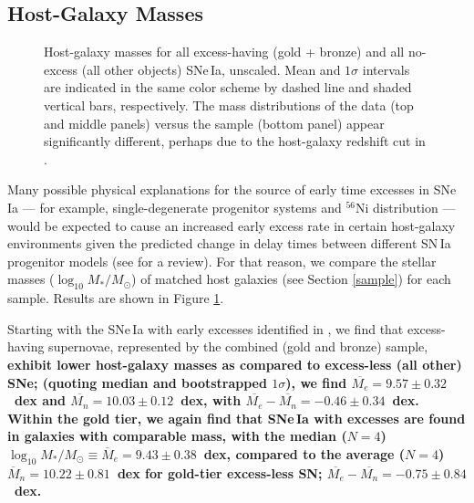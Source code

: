 \documentclass[twocolumn,twocolappendix, linenumbers]{aastex631} %
\begin{document}
\subsection{Host-Galaxy Masses}
\begin{figure}
     \centering
    \hfill

     \hfill
        \caption{Host-galaxy masses for all excess-having (gold + bronze) and all no-excess (all other objects) SNe\,Ia, unscaled. Mean and $1\sigma$ intervals are indicated in the same color scheme by dashed line and shaded vertical bars, respectively.  The mass distributions of the \citet{Yao19} data (top and middle panels) versus the \citet{Dhawan22} sample (bottom panel) appear significantly different, perhaps due to the host-galaxy redshift cut in \citet{Dhawan22}.
        }
        \label{fig:masses}
    
\end{figure}

Many possible physical explanations for the source of early time excesses in SNe\,Ia --- for example, single-degenerate progenitor systems \citep{Kasen10} and $^{56}$Ni distribution \citep{Piro13} --- would be expected to cause an increased early excess rate in certain host-galaxy environments given the predicted change in delay times between different SN\,Ia progenitor models (see \citealp{Maoz14} for a review).  
For that reason, we compare the stellar masses ($\log_{10} M_* / M_\odot$) of matched host galaxies (see Section \ref{sample}) for each sample. Results are shown in Figure \ref{fig:masses}.

Starting with the SNe\,Ia with early excesses identified in \cite{Burke22a}, we find that excess-having supernovae, represented by the combined (gold and bronze) sample, {\bf exhibit lower host-galaxy masses as compared to excess-less (all other) SNe; (quoting median and bootstrapped $1\sigma$), we find $\overline{M_{e}} = 9.57 \pm 0.32$~dex and $\overline{M_{n}} = 10.03 \pm 0.12$~dex, with $\overline{M_{e}} -\overline{M_n} = -0.46 \pm 0.34$~dex. Within the gold tier, we again find that SNe\,Ia with excesses are found in galaxies with comparable mass, with the median ($N = 4$) $\log_{10} M_*/M_\odot \equiv \overline{M}_{e} = 9.43 \pm 0.38$~dex, compared to the average ($N = 4$) $\overline{M}_{n} = 10.22 \pm 0.81$~dex for gold-tier excess-less SN; $\overline{M_e} - \overline{M_n} = -0.75 \pm 0.84$~dex.}
\end{document}

